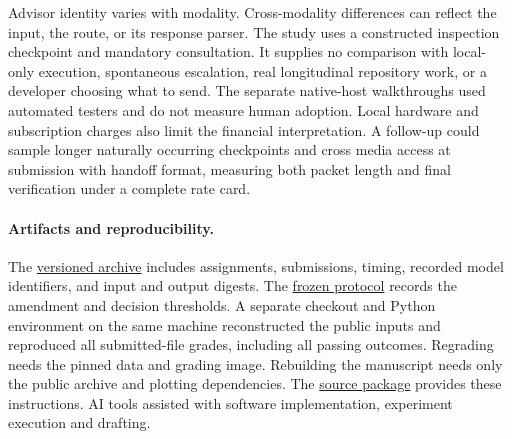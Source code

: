 \documentclass[10pt]{article}
\begin{document}
Advisor identity varies with modality. Cross-modality differences can reflect the input, the route, or its response parser. The study uses a constructed inspection checkpoint and mandatory consultation. It supplies no comparison with local-only execution, spontaneous escalation, real longitudinal repository work, or a developer choosing what to send. The separate native-host walkthroughs used automated testers and do not measure human adoption. Local hardware and subscription charges also limit the financial interpretation. A follow-up could sample longer naturally occurring checkpoints and cross media access at submission with handoff format, measuring both packet length and final verification under a complete rate card.

\paragraph{Artifacts and reproducibility.}
The \href{https://github.com/spot-advisor/spot-advisor/tree/v2.4.0/eval/results/spot24-release}{versioned archive} includes assignments, submissions, timing, recorded model identifiers, and input and output digests. The \href{https://github.com/spot-advisor/spot-advisor/blob/v2.4.0/docs/compression-confirmation-24.md}{frozen protocol} records the amendment and decision thresholds. A separate checkout and Python environment on the same machine reconstructed the public inputs and reproduced all \Submitted{} submitted-file grades, including all \TotalPass{} passing outcomes. Regrading needs the pinned data and grading image. Rebuilding the manuscript needs only the public archive and plotting dependencies. The \href{https://github.com/spot-advisor/spot-advisor/tree/paper-2.4-v1/paper/manuscript24}{source package} provides these instructions. AI tools assisted with software implementation, experiment execution and drafting.
\end{document}
